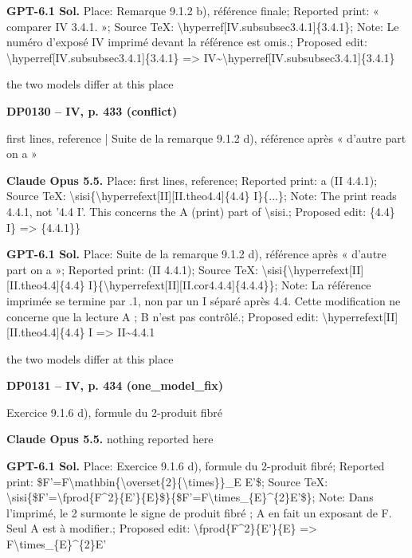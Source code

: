 \textbf{GPT-6.1 Sol.} Place: Remarque 9.1.2 b), référence finale; Reported print: « comparer IV 3.4.1. »; Source TeX: \textbackslash{}hyperref[IV.subsubsec3.4.1]\{3.4.1\}; Note: Le numéro d'exposé IV imprimé devant la référence est omis.; Proposed edit: \textbackslash{}hyperref[IV.subsubsec3.4.1]\{3.4.1\} =\allowbreak > IV\textasciitilde{}\textbackslash{}hyperref[IV.subsubsec3.4.1]\{3.4.1\}\par
the two models differ at this place\par
\par\noindent\hypertarget{DP0130}{}\textbf{DP0130 -- IV, p. 433 (conflict)}\par
first lines, reference | Suite de la remarque 9.1.2 d), référence après « d'autre part on a »\par
\textbf{Claude Opus 5.5.} Place: first lines, reference; Reported print: a (II 4.4.1); Source TeX: \textbackslash{}sisi\{\textbackslash{}hyperrefext[II][II.theo4.4]\{4.4\} I\}\{...\}; Note: The print reads 4.4.1, not '4.4 I'. This concerns the A (print) part of \textbackslash{}sisi.; Proposed edit: \{4.4\} I\} =\allowbreak > \{4.4.1\}\}\par
\textbf{GPT-6.1 Sol.} Place: Suite de la remarque 9.1.2 d), référence après « d'autre part on a »; Reported print: (II 4.4.1); Source TeX: \textbackslash{}sisi\{\textbackslash{}hyperrefext[II][II.theo4.4]\{4.4\} I\}\{\textbackslash{}hyperrefext[II][II.cor4.4.4]\{4.4.4\}\}; Note: La référence imprimée se termine par .1, non par un I séparé après 4.4. Cette modification ne concerne que la lecture A ; B n'est pas contrôlé.; Proposed edit: \textbackslash{}hyperrefext[II][II.theo4.4]\{4.4\} I =\allowbreak > II\textasciitilde{}4.4.1\par
the two models differ at this place\par
\par\noindent\hypertarget{DP0131}{}\textbf{DP0131 -- IV, p. 434 (one\_model\_fix)}\par
Exercice 9.1.6 d), formule du 2-produit fibré\par
\textbf{Claude Opus 5.5.} nothing reported here\par
\textbf{GPT-6.1 Sol.} Place: Exercice 9.1.6 d), formule du 2-produit fibré; Reported print: \$F'=\allowbreak F\textbackslash{}mathbin\{\textbackslash{}overset\{2\}\{\textbackslash{}times\}\}\_E E'\$; Source TeX: \textbackslash{}sisi\{\$F'=\allowbreak \textbackslash{}fprod\{F\textasciicircum{}2\}\{E'\}\{E\}\$\}\{\$F'=\allowbreak F\textbackslash{}times\_\{E\}\textasciicircum{}\{2\}E'\$\}; Note: Dans l'imprimé, le 2 surmonte le signe de produit fibré ; A en fait un exposant de F. Seul A est à modifier.; Proposed edit: \textbackslash{}fprod\{F\textasciicircum{}2\}\{E'\}\{E\} =\allowbreak > F\textbackslash{}times\_\{E\}\textasciicircum{}\{2\}E'\par
